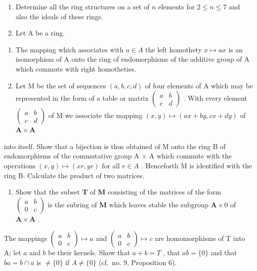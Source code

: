 \BourbakiExercisesSection

\begin{enumerate}
\def\labelenumi{\arabic{enumi}.}
\item
  Determine all the ring structures on a set of \(n\) elements for \(2 \leqslant n \leqslant 7\) and also the ideals of these rings.
\item
  Let A be a ring.
\end{enumerate}

\begin{enumerate}
\def\labelenumi{(\alph{enumi})}
\item
  The mapping which associates with \(a \in A\) the left homothety \(x \mapsto ax\) is an isomorphism of A onto the ring of endomorphisms of the additive group of A which commute with right homotheties.
\item
  Let M be the set of sequences \((a, b, c, d)\) of four elements of A which may be represented in the form of a table or matrix \(\begin{pmatrix} a & b \\ c & d \end{pmatrix}\) . With every element \(\begin{pmatrix} a & b \\ c & d \end{pmatrix}\) of M we associate the mapping \((x, y) \mapsto (ax + by, cx + dy)\) of \(\mathbf{A} \times \mathbf{A}\)
\end{enumerate}

into itself. Show that a bijection is thus obtained of M onto the ring B of endomorphisms of the commutative group A × A which commute with the operations \((x, y) \mapsto (xr, yr)\) for all \(r \in A\) . Henceforth M is identified with the ring B. Calculate the product of two matrices.

\begin{enumerate}
\def\labelenumi{(\alph{enumi})}
\setcounter{enumi}{2}
\tightlist
\item
  Show that the subset \(\mathbf{T}\) of \(\mathbf{M}\) consisting of the matrices of the form \(\begin{pmatrix} a & b \\ 0 & c \end{pmatrix}\) is the subring of \(\mathbf{M}\) which leaves stable the subgroup \(\mathbf{A} \times 0\) of \(\mathbf{A} \times \mathbf{A}\) .
\end{enumerate}

The mappings \(\begin{pmatrix} a & b \\ 0 & c \end{pmatrix} \mapsto a\) and \(\begin{pmatrix} a & b \\ 0 & c \end{pmatrix} \mapsto c\) are homomorphisms of T into A; let \(a\) and \(b\) be their kernels. Show that \(a + b = T\) , that \(ab = \{0\}\) and that \(ba = b \cap a\) is \(\neq \{0\}\) if \(A \neq \{0\}\) (cf.~no. 9, Proposition 6).

